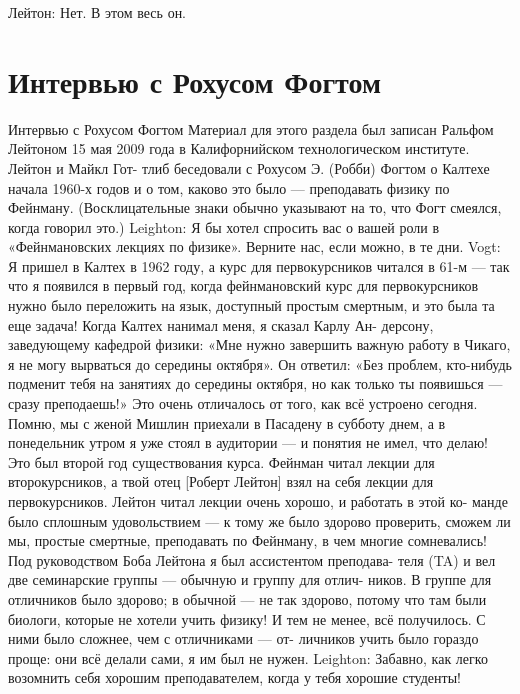 \documentclass[10pt,oneside]{article}
\begin{document}
Лейтон: Нет. В этом весь он.\par

\clearpage
{}
\section*{Интервью с Рохусом Фогтом}
\label{tips-sec-8-интервью-с-рохусом-фогтом}
Интервью с Рохусом Фогтом Материал для этого раздела был записан Ральфом Лейтоном 15 мая 2009 года в Калифорнийском технологическом институте. Лейтон и Майкл Гот- тлиб беседовали с Рохусом Э. (Робби) Фогтом о Калтехе начала 1960-х годов и о том, каково это было --- преподавать физику по Фейнману. (Восклицательные знаки обычно указывают на то, что Фогт смеялся, когда говорил это.) Leighton: Я бы хотел спросить вас о вашей роли в «Фейнмановских лекциях по физике». Верните нас, если можно, в те дни. Vogt: Я пришел в Калтех в 1962 году, а курс для первокурсников читался в 61-м --- так что я появился в первый год, когда фейнмановский курс для первокурсников нужно было переложить на язык, доступный простым смертным, и это была та еще задача! Когда Калтех нанимал меня, я сказал Карлу Ан- дерсону, заведующему кафедрой физики: «Мне нужно завершить важную работу в Чикаго, я не могу вырваться до середины октября». Он ответил: «Без проблем, кто-нибудь подменит тебя на занятиях до середины октября, но как только ты появишься --- сразу преподаешь!» Это очень отличалось от того, как всё устроено сегодня. Помню, мы с женой Мишлин приехали в Пасадену в субботу днем, а в понедельник утром я уже стоял в аудитории --- и понятия не имел, что делаю! Это был второй год существования курса. Фейнман читал лекции для второкурсников, а твой отец [Роберт Лейтон] взял на себя лекции для первокурсников. Лейтон читал лекции очень хорошо, и работать в этой ко- манде было сплошным удовольствием --- к тому же было здорово проверить, сможем ли мы, простые смертные, преподавать по Фейнману, в чем многие сомневались! Под руководством Боба Лейтона я был ассистентом преподава- теля (TA) и вел две семинарские группы --- обычную и группу для отлич- ников. В группе для отличников было здорово; в обычной --- не так здорово, потому что там были биологи, которые не хотели учить физику! И тем не менее, всё получилось. С ними было сложнее, чем с отличниками --- от- личников учить было гораздо проще: они всё делали сами, я им был не нужен. Leighton: Забавно, как легко возомнить себя хорошим преподавателем, когда у тебя хорошие студенты!\par
\end{document}
